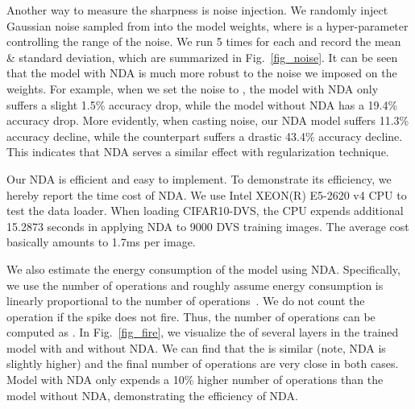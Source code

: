\documentclass[runningheads]{llncs}
\newcommand{\bftab}{\fontseries{b}\selectfont}
\begin{document}


Another way to measure the sharpness is noise injection. We randomly inject Gaussian noise sampled from  into the model weights, where  is a hyper-parameter controlling the range of the noise. We run 5 times for each  and record the mean \& standard deviation, which are summarized in Fig.~\ref{fig_noise}. It can be seen that the model with NDA is much more robust to the noise we imposed on the weights. For example, when we set the noise to , the model with NDA only suffers a slight 1.5\% accuracy drop, while the model without NDA has a 19.4\% accuracy drop. More evidently, when casting  noise, our NDA model suffers 11.3\% accuracy decline, while the counterpart suffers a drastic 43.4\% accuracy decline. This indicates that NDA serves a similar effect with regularization technique.

\noindent{\bftab Algorithm Efficiency.}
Our NDA is efficient and easy to implement. To demonstrate its efficiency, we hereby report the time cost of NDA. We use Intel XEON(R) E5-2620 v4 CPU to test the data loader. When loading CIFAR10-DVS, the CPU expends additional 15.2873 seconds in applying NDA to 9000 DVS training images. The average cost basically amounts to 1.7ms per image. 

We also estimate the energy consumption of the model using NDA. Specifically, we use the number of operations and roughly assume energy consumption is linearly proportional to the number of operations~\cite{rathi2020diet,zheng2020going}. We do not count the operation if the spike does not fire. Thus, the number of operations can be computed as . In Fig.~\ref{fig_fire}, we visualize the  of several layers in the trained model with and without NDA. We can find that the  is similar (note, NDA is slightly higher) and the final number of operations are very close in both cases. Model with NDA only expends a 10\% higher number of operations than the model without NDA, demonstrating the efficiency of NDA. 
\end{document}
